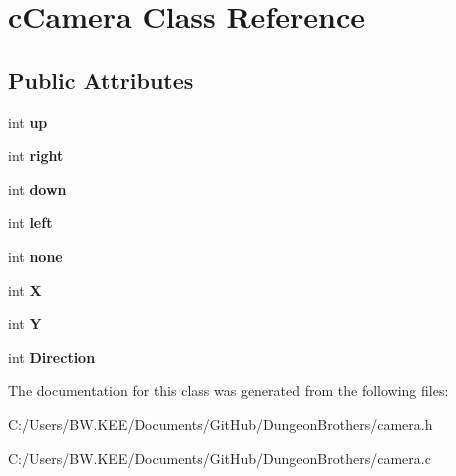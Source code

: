 \hypertarget{classc_camera}{\section{c\-Camera Class Reference}
\label{classc_camera}
}
\subsection*{Public Attributes}
\begin{DoxyCompactItemize}
\item 
\hypertarget{classc_camera_a62e36b937336e6bd339b651a770c7ee1}{int {\bfseries up}}\label{classc_camera_a62e36b937336e6bd339b651a770c7ee1}

\item 
\hypertarget{classc_camera_af721aac68a5f438be50a9ae057433356}{int {\bfseries right}}\label{classc_camera_af721aac68a5f438be50a9ae057433356}

\item 
\hypertarget{classc_camera_a34d7c56be2d8e4dbbd1ab72a74575945}{int {\bfseries down}}\label{classc_camera_a34d7c56be2d8e4dbbd1ab72a74575945}

\item 
\hypertarget{classc_camera_a3570540278b4673d39743fcac2bac670}{int {\bfseries left}}\label{classc_camera_a3570540278b4673d39743fcac2bac670}

\item 
\hypertarget{classc_camera_a15ecc854c43d9a8a48e0c42e75a14678}{int {\bfseries none}}\label{classc_camera_a15ecc854c43d9a8a48e0c42e75a14678}

\item 
\hypertarget{classc_camera_a80d81977a55a45291c663420a61c9993}{int {\bfseries X}}\label{classc_camera_a80d81977a55a45291c663420a61c9993}

\item 
\hypertarget{classc_camera_a158414cc2aa9a0e08087e91e876709f9}{int {\bfseries Y}}\label{classc_camera_a158414cc2aa9a0e08087e91e876709f9}

\item 
\hypertarget{classc_camera_a61ac25e1d39c85331aa8dac91b5dda63}{int {\bfseries Direction}}\label{classc_camera_a61ac25e1d39c85331aa8dac91b5dda63}

\end{DoxyCompactItemize}


The documentation for this class was generated from the following files\-:\begin{DoxyCompactItemize}
\item 
C\-:/\-Users/\-B\-W.\-K\-E\-E/\-Documents/\-Git\-Hub/\-Dungeon\-Brothers/camera.\-h\item 
C\-:/\-Users/\-B\-W.\-K\-E\-E/\-Documents/\-Git\-Hub/\-Dungeon\-Brothers/camera.\-c\end{DoxyCompactItemize}
